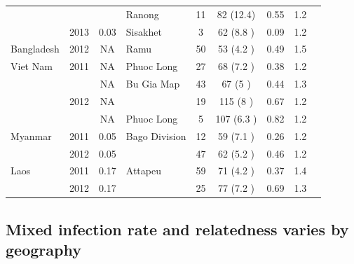 \documentclass[9pt,lineno]{elife}
\begin{document}
\begin{table}[btp]
{\begin{tabular}{p{1.4cm} c c |p{1.7cm} c c c c p{2.7cm}}
                &               &      &Ranong&11   &82   (12.4)&0.55 &1.2  &\\
                &2013           &0.03  &Sisakhet&3    &62   (8.8 )&0.09 &1.2  &\\
\cline{1-8}
Bangladesh      &2012           &NA    &Ramu &50   &53   (4.2 )&0.49 &1.5  &\\
\cline{1-8}
Viet Nam        &2011           &NA    &Phuoc Long&27   &68   (7.2 )&0.38 &1.2  &\\
                &               &NA    &Bu Gia Map&43   &67   (5   )&0.44 &1.3  &\\
                &2012           &NA    &               &19   &115  (8 )&0.67 &1.2  &\\
                &               &NA    &Phuoc Long&5    &107  (6.3 )&0.82 &1.2  &\\
\cline{1-8}
Myanmar         &2011           &0.05  &Bago Division &12   &59   (7.1 )&0.26 &1.2  &\\
                &2012           &0.05  &               &47   &62   (5.2 )&0.46 &1.2  &\\
\cline{1-8}
Laos            &2011           &0.17  &Attapeu        &59   &71   (4.2 )&0.37 &1.4  &\\
                &2012           &0.17  &               &25   &77   (7.2   )&0.69 &1.3  &\\
\hline
\bottomrule
\end{tabular}
}

\end{table}

\subsection{Mixed infection rate and relatedness varies by geography}
\end{document}
